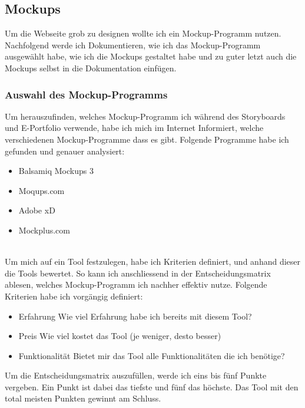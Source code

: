 \documentclass[11pt]{article}
\begin{document}
    \subsection{Mockups}
    Um die Webseite grob zu designen wollte ich ein Mockup-Programm nutzen. Nachfolgend werde ich Dokumentieren,
    wie ich das Mockup-Programm ausgewählt habe, wie ich die Mockups gestaltet habe und zu guter letzt auch
    die Mockups selbst in die Dokumentation einfügen.

    \subsubsection{Auswahl des Mockup-Programms}
    Um herauszufinden, welches Mockup-Programm ich während des Storyboards und E-Portfolio verwende, habe ich
    mich im Internet Informiert, welche verschiedenen Mockup-Programme dass es gibt. Folgende Programme habe
    ich gefunden und genauer analysiert:

    \begin{itemize}
        \item Balsamiq Mockups 3
        \item Moqups.com
        \item Adobe xD
        \item Mockplus.com
    \end{itemize}\\
    Um mich auf ein Tool festzulegen, habe ich Kriterien definiert, und anhand dieser die Tools bewertet. So
    kann ich anschliessend in der Entscheidungsmatrix ablesen, welches Mockup-Programm ich nachher effektiv
    nutze. Folgende Kriterien habe ich vorgängig definiert: %

    \begin{itemize}
        \item Erfahrung \textrightarrow Wie viel Erfahrung habe ich bereits mit diesem Tool?
        \item Preis \textrightarrow Wie viel kostet das Tool (je weniger, desto besser)
        \item Funktionalität \textrightarrow Bietet mir das Tool alle Funktionalitäten die ich benötige?
    \end{itemize}
    Um die Entscheidungsmatrix auszufüllen, werde ich eins bis fünf Punkte vergeben. Ein Punkt ist dabei das tiefste
    und fünf das höchste. Das Tool mit den total meisten Punkten gewinnt am Schluss.\\
\end{document}
